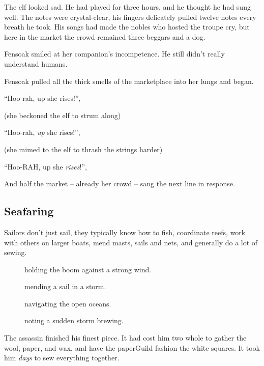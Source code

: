 \begin{multicols}{2}
\begin{exampletext}
  The elf looked sad.
  He had played for three hours, and he thought he had sung well.
  The notes were crystal-clear, his fingers delicately pulled twelve notes every breath he took.
  His songs had made the nobles who hosted the troupe cry, but here in the market the crowd remained three beggars and a dog.

  Fensoak smiled at her companion's incompetence.
  He still didn't really understand humans.

  Fensoak pulled all the thick smells of the marketplace into her lungs and began.

  ``Hoo-rah, up she rises!'',

  (she beckoned the elf to strum along)

  ``Hoo-rah, \emph{up} she rises!'',

  (she mimed to the elf to thrash the strings harder)

  ``Hoo-RAH, up she \emph{rises}!'',

  And half the market -- already her crowd -- sang the next line in response.

\end{exampletext}

\subsection{Seafaring}

Sailors don't just sail, they typically know how to fish, coordinate reefs, work with others on larger boats, mend masts, sails and nets, and generally do a lot of sewing.

\begin{description}
  \item[]
    holding the boom against a strong wind.
  \item[]
    mending a sail in a storm.
  \item[]
    navigating the open oceans.
  \item[]
    noting a sudden storm brewing.
\end{description}

\begin{exampletext}
  The assassin finished his finest piece.
  It had cost him two whole  to gather the wool, paper, and wax, and have the \gls{paperGuild} fashion the white squares.
  It took him \emph{days} to sew everything together.


\end{exampletext}
\end{multicols}
